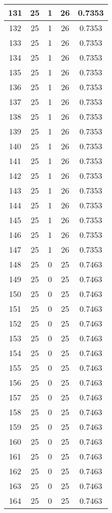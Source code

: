 \documentclass[letterpaper, 12pt]{article}
\begin{document}
\begin{longtable}{|c|c|c|c|c|}
\hline
131 & 25 & 1 & 26 & 0.7353 \\
\hline
132 & 25 & 1 & 26 & 0.7353 \\
\hline
133 & 25 & 1 & 26 & 0.7353 \\
\hline
134 & 25 & 1 & 26 & 0.7353 \\
\hline
135 & 25 & 1 & 26 & 0.7353 \\
\hline
136 & 25 & 1 & 26 & 0.7353 \\
\hline
137 & 25 & 1 & 26 & 0.7353 \\
\hline
138 & 25 & 1 & 26 & 0.7353 \\
\hline
139 & 25 & 1 & 26 & 0.7353 \\
\hline
140 & 25 & 1 & 26 & 0.7353 \\
\hline
141 & 25 & 1 & 26 & 0.7353 \\
\hline
142 & 25 & 1 & 26 & 0.7353 \\
\hline
143 & 25 & 1 & 26 & 0.7353 \\
\hline
144 & 25 & 1 & 26 & 0.7353 \\
\hline
145 & 25 & 1 & 26 & 0.7353 \\
\hline
146 & 25 & 1 & 26 & 0.7353 \\
\hline
147 & 25 & 1 & 26 & 0.7353 \\
\hline
148 & 25 & 0 & 25 & 0.7463 \\
\hline
149 & 25 & 0 & 25 & 0.7463 \\
\hline
150 & 25 & 0 & 25 & 0.7463 \\
\hline
151 & 25 & 0 & 25 & 0.7463 \\
\hline
152 & 25 & 0 & 25 & 0.7463 \\
\hline
153 & 25 & 0 & 25 & 0.7463 \\
\hline
154 & 25 & 0 & 25 & 0.7463 \\
\hline
155 & 25 & 0 & 25 & 0.7463 \\
\hline
156 & 25 & 0 & 25 & 0.7463 \\
\hline
157 & 25 & 0 & 25 & 0.7463 \\
\hline
158 & 25 & 0 & 25 & 0.7463 \\
\hline
159 & 25 & 0 & 25 & 0.7463 \\
\hline
160 & 25 & 0 & 25 & 0.7463 \\
\hline
161 & 25 & 0 & 25 & 0.7463 \\
\hline
162 & 25 & 0 & 25 & 0.7463 \\
\hline
163 & 25 & 0 & 25 & 0.7463 \\
\hline
164 & 25 & 0 & 25 & 0.7463 \\

\end{longtable}
\end{document}
